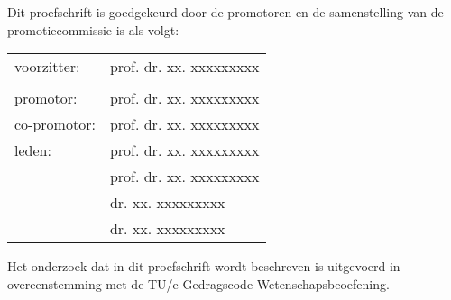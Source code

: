 \newpage
\thispagestyle{empty}

\noindent Dit proefschrift is goedgekeurd door de promotoren en de samenstelling van de promotiecommissie is als volgt:

\vspace{\baselineskip}

\noindent
\begin{tabular}{@{}l p{9.8cm}}
voorzitter:                 &   prof. dr. xx. xxxxxxxxx \\ \\
promotor:                   &   prof. dr. xx. xxxxxxxxx \\
co-promotor:                &   prof. dr. xx. xxxxxxxxx \\
leden:                      &   prof. dr. xx. xxxxxxxxx \\
                            &   prof. dr. xx. xxxxxxxxx \\
                            &   dr. xx. xxxxxxxxx \\
                            &   dr. xx. xxxxxxxxx \\
\end{tabular}

\vfill
\noindent
Het onderzoek dat in dit proefschrift wordt beschreven is uitgevoerd in overeenstemming met de TU/e Gedragscode Wetenschapsbeoefening.
